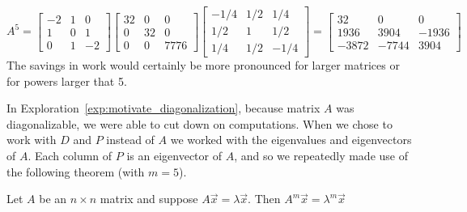 \documentclass{ximera}
\begin{document}
\begin{exploration}

$$A^5=\begin{bmatrix}
-2 & 1 & 0 \\
1 & 0 & 1 \\
0 & 1 & -2
\end{bmatrix}\begin{bmatrix}32 & 0 & 0\\0 &32 & 0\\0 & 0 & 7776\end{bmatrix}\begin{bmatrix}
-1/4 & 1/2 & 1/4 \\
1/2 & 1 & 1/2 \\
1/4 & 1/2 & -1/4
\end{bmatrix}=\begin{bmatrix}32 & 0 & 0\\
 1936 & 3904 & -1936\\
 -3872 & -7744 & 3904\end{bmatrix}$$
The savings in work would certainly be more pronounced for larger matrices or for powers larger that 5.


\end{exploration}  

In Exploration~\ref{exp:motivate_diagonalization}, because matrix $A$ was diagonalizable, we were able to cut down on computations.  When we chose to work with $D$ and $P$ instead of $A$ we worked with the eigenvalues and eigenvectors of $A$.  Each column of $P$ is an eigenvector of $A$, and so we repeatedly made use of the following theorem (with $m=5$).

\begin{theorem}\label{th:eigpowers}
Let $A$ be an $n \times n$ matrix and suppose $A\vec{x}=\lambda \vec{x}$.  Then $A^m \vec{x} = \lambda^m \vec{x}$
\end{theorem}
\end{document}
